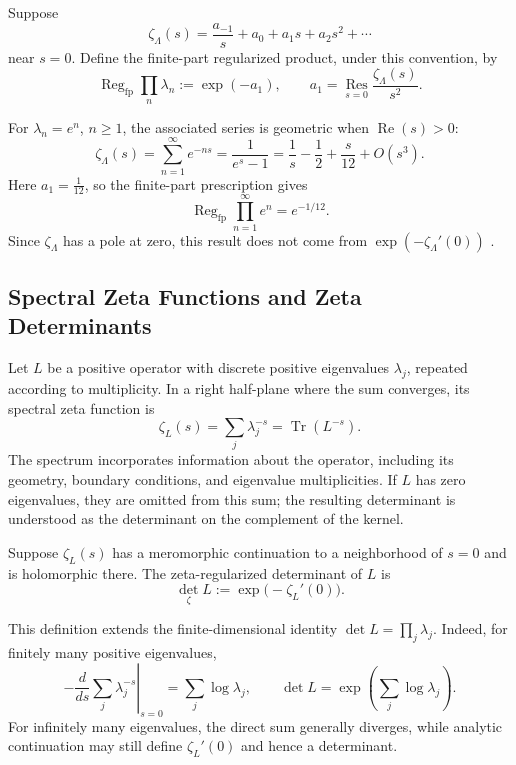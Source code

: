 \begin{definition}
Suppose
\[
 \zeta_\Lambda(s)=\frac{a_{-1}}{s}+a_0+a_1s+a_2s^2+\cdots
\]
near $s=0$. Define the finite-part regularized product, under this convention, by
\[
 \operatorname{Reg}_{\mathrm{fp}}\prod_n\lambda_n
 :=\exp(-a_1),
 \qquad
 a_1=\operatorname*{Res}_{s=0}\frac{\zeta_\Lambda(s)}{s^2}.
\]
\end{definition}

\begin{example}
For $\lambda_n=e^n$, $n\geq1$, the associated series is geometric when $\operatorname{Re}(s)>0$:
\[
 \zeta_\Lambda(s)=\sum_{n=1}^{\infty}e^{-ns}
 =\frac{1}{e^s-1}
 =\frac1s-\frac12+\frac{s}{12}+O(s^3).
\]
Here $a_1=\tfrac1{12}$, so the finite-part prescription gives
\[
 \operatorname{Reg}_{\mathrm{fp}}\prod_{n=1}^{\infty}e^n=e^{-1/12}.
\]
Since $\zeta_\Lambda$ has a pole at zero, this result does not come from $\exp(-\zeta_\Lambda'(0))$ \cite{SotoVillada2026ZR}.
\end{example}

\subsection{Spectral Zeta Functions and Zeta Determinants}

Let $L$ be a positive operator with discrete positive eigenvalues $\lambda_j$, repeated according to multiplicity. In a right half-plane where the sum converges, its spectral zeta function is
\[
 \zeta_L(s)=\sum_j\lambda_j^{-s}=\operatorname{Tr}(L^{-s}).
\]
The spectrum incorporates information about the operator, including its geometry, boundary conditions, and eigenvalue multiplicities. If $L$ has zero eigenvalues, they are omitted from this sum; the resulting determinant is understood as the determinant on the complement of the kernel.

\begin{definition}
Suppose $\zeta_L(s)$ has a meromorphic continuation to a neighborhood of $s=0$ and is holomorphic there. The zeta-regularized determinant of $L$ is
\[
 \det_{\zeta}L:=\exp\!\bigl(-\zeta_L'(0)\bigr).
\]
\end{definition}

This definition extends the finite-dimensional identity $\det L=\prod_j\lambda_j$. Indeed, for finitely many positive eigenvalues,
\[
 -\left.\frac{d}{ds}\sum_j\lambda_j^{-s}\right|_{s=0}
 =\sum_j\log\lambda_j,
 \qquad
 \det L=\exp\!\left(\sum_j\log\lambda_j\right).
\]
For infinitely many eigenvalues, the direct sum generally diverges, while analytic continuation may still define $\zeta_L'(0)$ and hence a determinant.

